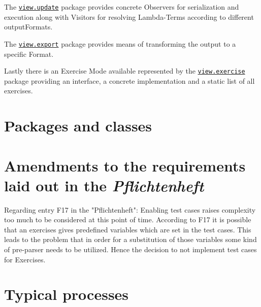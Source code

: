 \documentclass[a4paper, parskip=half]{scrartcl}
\newcommand{\pkglnk}[1]{\hyperref[pkg:edu.kit.wavelength.client.#1]{#1}}
\begin{document}
The \texttt{\pkglnk{view.update}} package provides concrete Observers for serialization and execution along with
Visitors for resolving Lambda-Terms according to different outputFormats.

The \texttt{\pkglnk{view.export}} package provides means of transforming the output to a specific Format.

Lastly there is an Exercise Mode available represented by the \texttt{\pkglnk{view.exercise}} package providing
an interface, a concrete implementation and a static list of all exercises.

\section{Packages and classes}


\section{Amendments to the requirements laid out in the \textit{Pflichtenheft}}

Regarding entry F17 in the "Pflichtenheft":
Enabling test cases raises complexity too much to be considered at this point of time.
According to F17 it is possible that an exercises gives predefined variables which
are set in the test cases. This leads to the problem that in order for a substitution of
those variables some kind of pre-parser needs to be utilized.
Hence the decision to not implement test cases for Exercises.

\section{Typical processes}

\end{document}
